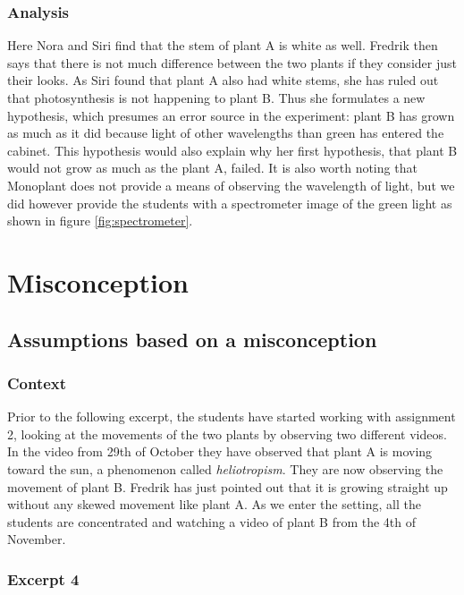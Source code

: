 \subsubsection*{Analysis}
Here Nora and Siri find that the stem of plant A is white as well. Fredrik then says that there is not much difference between the two plants if they consider just their looks. As Siri found that plant A also had white stems, she has ruled out that photosynthesis is not happening to plant B. Thus she formulates a new hypothesis, which presumes an error source in the experiment: plant B has grown as much as it did because light of other wavelengths than green has entered the cabinet.
This hypothesis would also explain why her first hypothesis, that plant B would not grow as much as the plant A, failed. It is also worth noting that Monoplant does not provide a means of observing the wavelength of light, but we did however provide the students with a spectrometer image of the green light as shown in figure \ref{fig:spectrometer}.

\section{Misconception}
\label{cha:guidedinquiry}


\subsection{Assumptions based on a misconception}

\subsubsection*{Context}
Prior to the following excerpt, the students have started working with assignment 2, looking at the movements of the two plants by observing two different videos. In the video from 29th of October they have observed that plant A is moving toward the sun, a phenomenon called \emph{heliotropism}. They are now observing the movement of plant B. Fredrik has just pointed out that it is growing straight up without any skewed movement like plant A. As we enter the setting, all the students are concentrated and watching a video of plant B from the 4th of November.


\subsubsection*{Excerpt 4}\label{ex:excerpt4}

